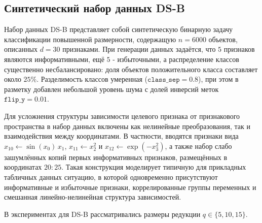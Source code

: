 \documentclass[12pt,a4paper]{article}
\begin{document}
\subsection{Синтетический набор данных DS-B}

Набор данных DS-B представляет собой синтетическую бинарную задачу классификации повышенной размерности,
содержащую $n=6000$ объектов, описанных $d=30$ признаками. При генерации данных задаётся,
что $5$ признаков являются информативными, ещё $5$ - избыточными, а распределение классов
существенно несбалансировано: доля объектов положительного класса составляет около $25\%$.
Разделимость классов умеренная ($\texttt{class\_sep}=0.8$), при этом в разметку добавлен небольшой
уровень шума с долей инверсий меток $\texttt{flip\_y}=0.01$.

Для усложнения структуры зависимости целевого признака от признакового пространства в набор данных
включены как нелинейные преобразования, так и взаимодействия между координатами. В частности,
вводятся признаки вида $x_{10}\leftarrow \sin(x_0)\,x_1$, $x_{11}\leftarrow x_2^2$ и
$x_{12}\leftarrow \exp(-x_3^2)$, а также набор слабо зашумлённых копий первых информативных признаков,
размещённых в координатах $20{:}25$. Такая конструкция моделирует типичную для прикладных табличных данных
ситуацию, в которой одновременно присутствуют информативные и избыточные признаки, коррелированные группы
переменных и смешанная линейно-нелинейная структура зависимостей.

В экспериментах для DS-B рассматривались размеры редукции $q\in\{5,10,15\}$.

\begin{table}[H]
\caption{Результаты на DS-B (HGBT, $q=5$)}
\label{tab:exp:DSB:HGBT:q5}
\centering\small
{}
\end{table}
\end{document}
